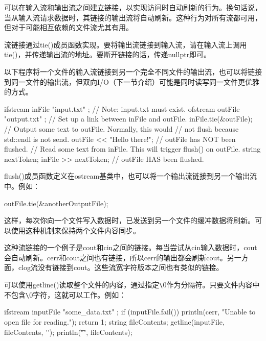 可以在输入流和输出流之间建立链接，以实现访问时自动刷新的行为。换句话说，当从输入流请求数据时，其链接的输出流将自动刷新。这种行为对所有流都可用，但对于可能相互依赖的文件流尤其有用。

流链接通过tie()成员函数实现。要将输出流链接到输入流，请在输入流上调用tie()，并传递输出流的地址。要断开链接的话，传递nullptr即可。

以下程序将一个文件的输入流链接到另一个完全不同文件的输出流，也可以将链接到同一文件的输出流，但双向I/O（下一节介绍）可能是同时读写同一文件更优雅的方式。

\begin{cpp}
ifstream inFile { "input.txt" }; // Note: input.txt must exist.
ofstream outFile { "output.txt" };
// Set up a link between inFile and outFile.
inFile.tie(&outFile);
// Output some text to outFile. Normally, this would
// not flush because std::endl is not send.
outFile << "Hello there!";
// outFile has NOT been flushed.
// Read some text from inFile. This will trigger flush() on outFile.
string nextToken;
inFile >> nextToken;
// outFile HAS been flushed.
\end{cpp}

flush()成员函数定义在ostream基类中，也可以将一个输出流链接到另一个输出流中。例如：

\begin{cpp}
outFile.tie(&anotherOutputFile);
\end{cpp}

这样，每次你向一个文件写入数据时，已发送到另一个文件的缓冲数据将刷新。可以使用这种机制来保持两个文件内容同步。

这种流链接的一个例子是cout和cin之间的链接。每当尝试从cin输入数据时，cout会自动刷新。cerr和cout之间也有链接，所以cerr的输出都会刷新cout。另一方面，clog流没有链接到cout。这些流宽字符版本之间也有类似的链接。


可以使用getline()读取整个文件的内容，通过指定\verb|\|0作为分隔符。只要文件内容中不包含\verb|\|0字符，这就可以工作。例如：

\begin{cpp}
ifstream inputFile { "some_data.txt" };
if (inputFile.fail()) {
    println(cerr, "Unable to open file for reading.");
    return 1;
}
string fileContents;
getline(inputFile, fileContents, '\0');
println("\"{}\"", fileContents);
\end{cpp}














